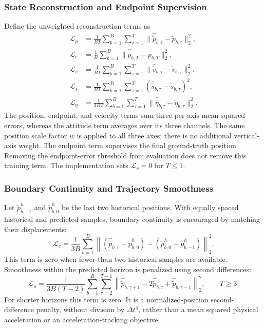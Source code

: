 \documentclass[12pt]{article}
\begin{document}
\subsubsection{State Reconstruction and Endpoint Supervision}
Define the unweighted reconstruction terms as
\begin{align}
\mathcal{L}_{p} &= \frac{1}{BT}\sum_{b=1}^{B}\sum_{\tau=1}^{T}
 \|\hat{\tilde p}_{b,\tau}-\tilde p_{b,\tau}\|_2^2, \\
\mathcal{L}_{e} &= \frac{1}{B}\sum_{b=1}^{B}
 \|\hat{\tilde p}_{b,T}-\tilde p_{b,T}\|_2^2, \\
\mathcal{L}_{v} &= \frac{1}{BT}\sum_{b=1}^{B}\sum_{\tau=1}^{T}
 \|\hat{\tilde v}_{b,\tau}-\tilde v_{b,\tau}\|_2^2, \\
\mathcal{L}_{s} &= \frac{1}{BT}\sum_{b=1}^{B}\sum_{\tau=1}^{T}
 (\hat{\tilde s}_{b,\tau}-\tilde s_{b,\tau})^2, \\
\mathcal{L}_{\eta} &= \frac{1}{3BT}\sum_{b=1}^{B}\sum_{\tau=1}^{T}
 \|\hat{\tilde\eta}_{b,\tau}-\tilde\eta_{b,\tau}\|_2^2.
\end{align}
The position, endpoint, and velocity terms sum three per-axis mean squared
errors, whereas the attitude term averages over its three channels. The same
position scale factor $w$ is applied to all three axes; there is no additional
vertical-axis weight. The endpoint term supervises the final ground-truth
position. Removing the endpoint-error threshold from evaluation does not remove
this training term. The implementation sets $\mathcal{L}_{v}=0$ for $T\leq1$.

\subsubsection{Boundary Continuity and Trajectory Smoothness}
Let $\tilde p^h_{b,-1}$ and $\tilde p^h_{b,0}$ be the last two historical
positions. With equally spaced historical and predicted samples, boundary
continuity is encouraged by matching their displacements:
\begin{equation}
\mathcal{L}_{c}=\frac{1}{3B}\sum_{b=1}^{B}
\left\|(\hat{\tilde p}_{b,1}-\tilde p^h_{b,0})
 -(\tilde p^h_{b,0}-\tilde p^h_{b,-1})\right\|_2^2.
\end{equation}
This term is zero when fewer than two historical samples are available.
Smoothness within the predicted horizon is penalized using second differences:
\begin{equation}
\mathcal{L}_{a}=\frac{1}{3B(T-2)}\sum_{b=1}^{B}\sum_{\tau=2}^{T-1}
\left\|\hat{\tilde p}_{b,\tau+1}-2\hat{\tilde p}_{b,\tau}
 +\hat{\tilde p}_{b,\tau-1}\right\|_2^2,\qquad T\geq3.
\end{equation}
For shorter horizons this term is zero. It is a normalized-position
second-difference penalty, without division by $\Delta t^4$, rather than a
mean squared physical acceleration or an acceleration-tracking objective.
\end{document}
